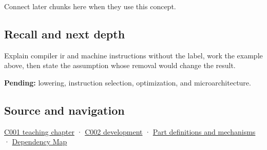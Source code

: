 Connect later chunks here when they use this concept.

\subsection{Recall and next depth}\label{appendix-942ad41afb30-recall-and-next-depth}

Explain compiler ir and machine instructions without the label, work the example above, then state the assumption whose removal would change the result.

\textbf{Pending:} lowering, instruction selection, optimization, and microarchitecture.

\subsection{Source and navigation}\label{appendix-942ad41afb30-source-and-navigation}

\hyperref[01-foundations-i-ch001-from-a-signal-to-an-interpretation]{C001 teaching chapter} · \hyperref[01-foundations-i-ch001-arithmetic-becomes-a-policy]{C002 development} · \hyperref[appendix-fd090d982a15]{Part definitions and mechanisms} · \hyperref[appendix-4ad47bdd269a]{Dependency Map}
